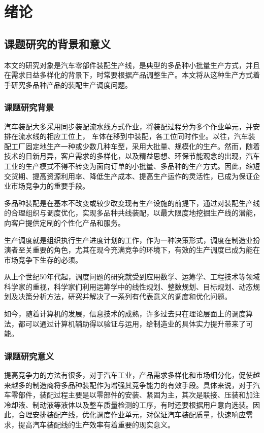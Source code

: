 \chapter{绪论}
\section{课题研究的背景和意义}
本文的研究对象是汽车零部件装配生产线，是典型的多品种小批量生产方式，并且在需求日益多样化的背景下，时常要根据产品调整生产。本文将从这种生产方式着手研究多品种产品的装配生产调度问题。

\subsection{课题研究背景}
汽车装配大多采用同步装配流水线方式作业，将装配过程分为多个作业单元，并安排在流水线的相应工位上，
车体在移到中装配，各工位同时作业。以往，汽车装配工厂固定地生产一种或少数几种车型，采用大批量、规模化的生产。然而，随着技术的日新月异，客户需求的多样化，以及精益思想、环保节能观念的出现，汽车工业的生产模式不得不转变为面向订单的小批量、多品种的生产方式。因此，缩短交货期、提高资源利用率、降低生产成本、提高生产运作的灵活性，已成为保证企业市场竞争力的重要手段。

多品种装配是在基本不改变或较少改变现有生产设施的前提下，通过对装配生产线的合理组织与调度优化，实现多品种共线装配，以最大限度地挖掘生产线的潜能，向客户提供定制的个性化产品和服务。

生产调度就是组织执行生产进度计划的工作，作为一种决策形式，调度在制造业扮演者至关重要的角色，尤其在现今充满竞争的环境下，有效的生产调度已成为能在市场竞争下生存的必须。

从上个世纪50年代起，调度问题的研究就受到应用数学、运筹学、工程技术等领域科学家的重视，科学家们利用运筹学中的线性规划、整数规划、目标规划、动态规划及决策分析方法，研究并解决了一系列有代表意义的调度和优化问题\cite{徐俊刚2004}。

如今，随着计算机的发展，信息技术的成熟，许多过去只在理论层面上的调度算法，都可以通过计算机辅助得以验证与运用，给制造业的具体实力提升带来了可能。

\subsection{课题研究意义}
提高竞争力的方法有很多，对于汽车工业，产品需求多样化和市场细分化，促使越来越多的制造商将多品种装配作为增强其竞争能力的有效手段。具体来说，对于汽车零部件，装配过程主要是以零部件的安装、紧固为主，其次是联接、压装和加注冷却液、制动液等液体以及整车质量检测的工序，有时还要根据用户意向选装。因此，合理安排装配产线，优化调度作业单元，对保证汽车装配质量，快速响应需求，提高汽车装配线的生产效率有着重要的现实意义。

